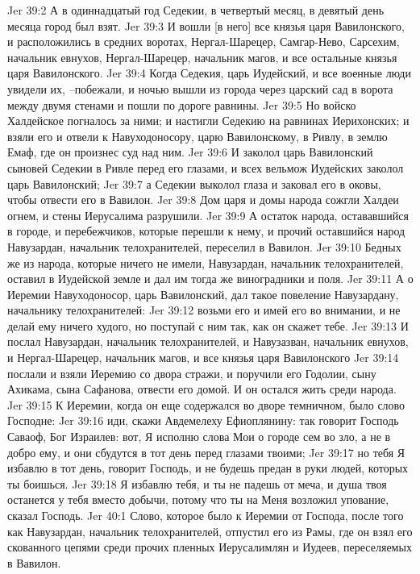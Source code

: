 Jer 39:2  А в одиннадцатый год Седекии, в четвертый месяц, в девятый день месяца город был взят.
Jer 39:3  И вошли [в него] все князья царя Вавилонского, и расположились в средних воротах, Нергал-Шарецер, Самгар-Нево, Сарсехим, начальник евнухов, Нергал-Шарецер, начальник магов, и все остальные князья царя Вавилонского.
Jer 39:4  Когда Седекия, царь Иудейский, и все военные люди увидели их, --побежали, и ночью вышли из города через царский сад в ворота между двумя стенами и пошли по дороге равнины.
Jer 39:5  Но войско Халдейское погналось за ними; и настигли Седекию на равнинах Иерихонских; и взяли его и отвели к Навуходоносору, царю Вавилонскому, в Ривлу, в землю Емаф, где он произнес суд над ним.
Jer 39:6  И заколол царь Вавилонский сыновей Седекии в Ривле перед его глазами, и всех вельмож Иудейских заколол царь Вавилонский;
Jer 39:7  а Седекии выколол глаза и заковал его в оковы, чтобы отвести его в Вавилон.
Jer 39:8  Дом царя и домы народа сожгли Халдеи огнем, и стены Иерусалима разрушили.
Jer 39:9  А остаток народа, остававшийся в городе, и перебежчиков, которые перешли к нему, и прочий оставшийся народ Навузардан, начальник телохранителей, переселил в Вавилон.
Jer 39:10  Бедных же из народа, которые ничего не имели, Навузардан, начальник телохранителей, оставил в Иудейской земле и дал им тогда же виноградники и поля.
Jer 39:11  А о Иеремии Навуходоносор, царь Вавилонский, дал такое повеление Навузардану, начальнику телохранителей:
Jer 39:12  возьми его и имей его во внимании, и не делай ему ничего худого, но поступай с ним так, как он скажет тебе.
Jer 39:13  И послал Навузардан, начальник телохранителей, и Навузазван, начальник евнухов, и Нергал-Шарецер, начальник магов, и все князья царя Вавилонского
Jer 39:14  послали и взяли Иеремию со двора стражи, и поручили его Годолии, сыну Ахикама, сына Сафанова, отвести его домой. И он остался жить среди народа.
Jer 39:15  К Иеремии, когда он еще содержался во дворе темничном, было слово Господне:
Jer 39:16  иди, скажи Авдемелеху Ефиоплянину: так говорит Господь Саваоф, Бог Израилев: вот, Я исполню слова Мои о городе сем во зло, а не в добро ему, и они сбудутся в тот день перед глазами твоими;
Jer 39:17  но тебя Я избавлю в тот день, говорит Господь, и не будешь предан в руки людей, которых ты боишься.
Jer 39:18  Я избавлю тебя, и ты не падешь от меча, и душа твоя останется у тебя вместо добычи, потому что ты на Меня возложил упование, сказал Господь.
Jer 40:1  Слово, которое было к Иеремии от Господа, после того как Навузардан, начальник телохранителей, отпустил его из Рамы, где он взял его скованного цепями среди прочих пленных Иерусалимлян и Иудеев, переселяемых в Вавилон.
